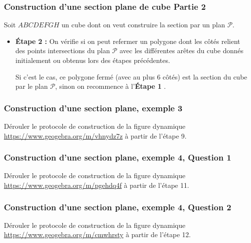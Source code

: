 \documentclass[xcolor=svgnames,t,final]{beamer}
\begin{document}
\begin{frame}



\frametitle{Construction d'une section plane de cube Partie 2 }

\begin{block}



Soit $ABCDEFGH$ un cube dont on veut construire la section par un plan $\mathcal{P}$.

\begin{itemize}

		\item \textbf{Étape 2 :} On vérifie si on peut refermer un polygone dont les côtés relient des points intersections du plan $\mathcal{P}$  avec les différentes arêtes du cube donnés initialement ou obtenus lors des étapes précédentes. 
		
		Si c'est le cas, ce polygone fermé (avec au plus $6$ côtés) est la section du cube par le plan $\mathcal{P}$, sinon on recommence à l'\textbf{Étape 1} .	
\end{itemize}
\end{block}


\end{frame}



\begin{frame}



\frametitle{Construction d'une section plane, exemple 3}


Dérouler le protocole de construction de la figure dynamique \href{https://www.geogebra.org/m/vhnydz7z}{https://www.geogebra.org/m/vhnydz7z} à partir de l'étape 9.

\end{frame}



\begin{frame}
\label{exemple4}


\frametitle{Construction d'une section plane, exemple 4, Question 1}


Dérouler le protocole de construction de la figure dynamique \href{https://www.geogebra.org/m/pgehdq4f}{https://www.geogebra.org/m/pgehdq4f} à partir de l'étape 11.

\end{frame}




\begin{frame}



\frametitle{Construction d'une section plane, exemple 4, Question 2}


Dérouler le protocole de construction de la figure dynamique \href{https://www.geogebra.org/m/cmwhrsty}{https://www.geogebra.org/m/cmwhrsty} à partir de l'étape 12.

\end{frame}
\end{document}
